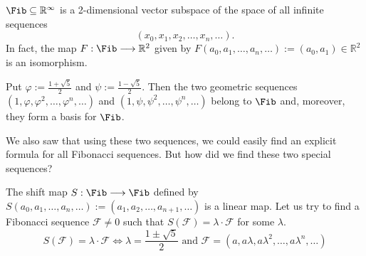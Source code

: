 \begin{claim*}\label{claim:fib_subspace}
  $\Fib \subseteq \mathbb{R}^{\infty}$ is a 2-dimensional vector subspace of the space of all infinite sequences \[(x_0, x_1, x_2, \dots, x_n, \dots).\]
  In fact, the map $F : \Fib \longrightarrow \mathbb{R}^2$ given by $F(a_0, a_1, \dots, a_n, \dots) := (a_0, a_1) \in \mathbb{R}^2$ is an isomorphism.
\end{claim*}

\begin{claim*}\label{claim:fib_basis}
  Put $\varphi := \frac{1+\sqrt{5}}{2}$ and $\psi := \frac{1-\sqrt{5}}{2}$. Then the two geometric sequences $(1, \varphi, \varphi^2, \dots, \varphi^n, \dots)$ and $(1, \psi, \psi^2, \dots, \psi^n, \dots)$ belong to $\Fib$ and, moreover, they form a basis for $\Fib$.
\end{claim*}

We also saw that using these two sequences, we could easily find an explicit formula for all Fibonacci sequences. But how did we find these two special sequences?

The shift map $S : \Fib \longrightarrow \Fib$ defined by $S(a_0, a_1, \dots, a_n, \dots) := (a_1, a_2, \dots, a_{n+1}, \dots)$ is a linear map.
Let us try to find a Fibonacci sequence $\mathcal{F} \ne 0$ such that $S(\mathcal{F}) = \lambda \cdot \mathcal{F}$ for some $\lambda$.
\[ S(\mathcal{F}) = \lambda \cdot \mathcal{F} \iff \lambda = \frac{1\pm\sqrt{5}}{2} \text{ and } \mathcal{F} = (a, a\lambda, a\lambda^2, \dots, a\lambda^n, \dots) \]


